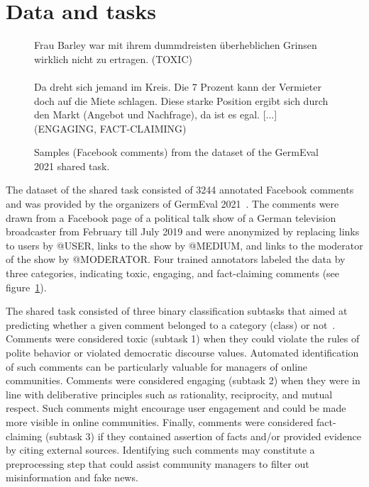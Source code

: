 \documentclass[11pt,a4paper]{article}
\begin{document}
\section{Data and tasks}

\begin{figure}
    \begin{mdframed}{
    Frau Barley war mit ihrem dummdreisten überheblichen Grinsen wirklich nicht zu ertragen. (TOXIC)\\
    \\
    Da dreht sich jemand im Kreis. Die 7 Prozent kann der Vermieter doch auf die Miete schlagen. Diese starke Position ergibt sich durch den Markt (Angebot und Nachfrage), da ist es egal. [...] (ENGAGING, FACT-CLAIMING)} 
    \end{mdframed}
    \caption{Samples (Facebook comments) from the dataset of the GermEval 2021 shared task. }
    \label{fig:example_data}
\end{figure}

The dataset of the shared task consisted of 3244 annotated Facebook comments and was provided by the organizers of GermEval 2021~\citep{Risch2021}. The comments were drawn from a Facebook page of a political talk show of a German television broadcaster from February till July 2019 and were anonymized by replacing links to users by @USER, links to the show by @MEDIUM, and links to the moderator of the show by @MODERATOR. Four trained annotators labeled the data by three categories, indicating toxic, engaging, and \mbox{fact-claiming} comments (see figure~\ref{fig:example_data}).

The shared task consisted of three binary classification subtasks that aimed at predicting whether a given comment belonged to a category (class) or not~\citep{Risch2021}. Comments were considered toxic (subtask 1) when they could violate the rules of polite behavior or violated democratic discourse values. Automated identification of such comments can be particularly valuable for managers of online communities. Comments were considered engaging (subtask 2) when they were in line with deliberative principles such as rationality, reciprocity, and mutual respect. Such comments might encourage user engagement and could be made more visible in online communities. Finally, comments were considered fact-claiming (subtask 3) if they contained assertion of facts and/or provided evidence by citing external sources. Identifying such comments may constitute a preprocessing step that could assist community managers to filter out misinformation and fake news.
\end{document}
